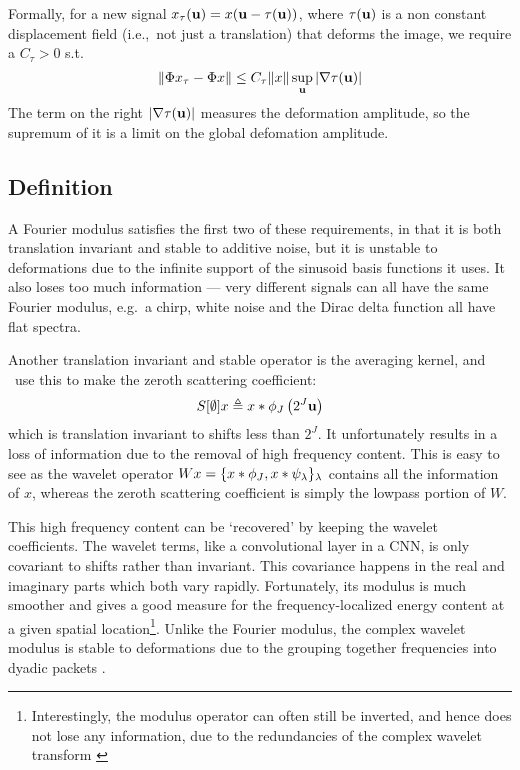   Formally, for a new signal
  $x_{\tau}(\mathbf{u}) = x(\mathbf{u}-\tau(\mathbf{u}))$, where $\tau(\mathbf{u})$ is a non
  constant displacement field (i.e.,\ not just a translation) that deforms the
  image, we require a $C_\tau>0$ s.t.
  \protect\begin{equation}\label{eq:scat_deformation_stability}
    \|\Phi x_{\tau} - \Phi x \| \leq C_\tau \|x\| \sup_{\mathbf{u}} |\nabla\tau(\mathbf{u})|
  \protect\end{equation}
  The term on the right $|\nabla\tau(\mathbf{u})|$ measures the deformation
  amplitude, so the supremum of it is a limit on the global defomation amplitude.

\subsection{Definition}
  A Fourier modulus satisfies the first two of these requirements, in that it is
  both translation invariant and stable to additive noise, but it is unstable to
  deformations due to the infinite support of the sinusoid basis functions it
  uses. It also loses too much information --- very different signals can all
  have the same Fourier modulus, e.g.\ a chirp, white noise and the Dirac delta
  function all have flat spectra.

  Another translation invariant and stable operator is the averaging kernel, and
  \Mallat\ use this to make the zeroth scattering coefficient:
  \begin{equation}
    S[\emptyset]x \triangleq x \ast \phi_J\left(2^J \mathbf{u}\right)
  \end{equation}
  which is translation invariant to shifts less than $2^J$. It unfortunately
  results in a loss of information due to the removal of high frequency content.
  This is easy to see as the wavelet operator 
  $Wx = \{ x \ast \phi_J, x \ast \psi_\lambda \}_\lambda$
contains all the information of $x$, whereas the zeroth scattering coefficient
is simply the lowpass portion of $W$. 

This high frequency content can be `recovered' by keeping the wavelet
coefficients. The wavelet terms, like a convolutional layer in a CNN, is only
covariant to shifts rather than invariant. This covariance happens in the real 
and imaginary parts which both vary rapidly. Fortunately, its modulus is much
smoother and gives a good measure for the frequency-localized energy content at
a given spatial location\footnote{Interestingly, the modulus operator can often still be
inverted, and hence does not lose any information, due to the redundancies of
the complex wavelet transform \cite{waldspurger_phase_2012}}. Unlike
the Fourier modulus, the complex wavelet modulus is stable to deformations due
to the grouping together frequencies into dyadic packets
\cite{mallat_group_2012}. 

